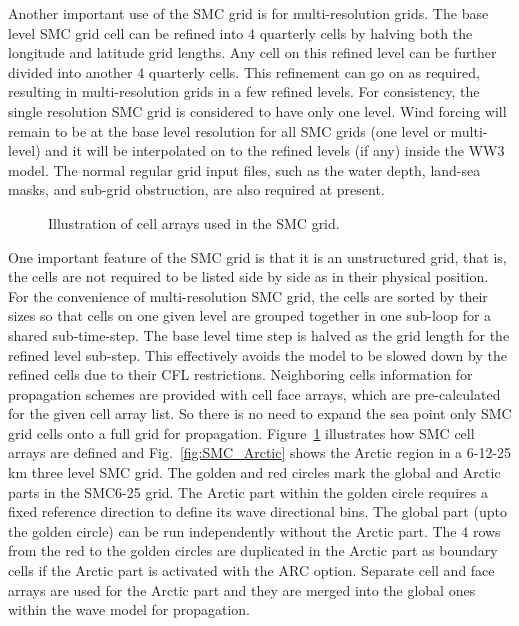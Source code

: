 Another important use of the SMC grid is for multi-resolution grids.
The base level SMC grid cell can be refined into 4 quarterly cells
by halving both the longitude and latitude grid lengths. Any cell
on this refined level can be further divided into another 4 quarterly
cells. This refinement can go on as required, resulting in multi-resolution
grids in a few refined levels. For consistency, the single resolution
SMC grid is considered to have only one level. Wind forcing will remain
to be at the base level resolution for all SMC grids (one level or
multi-level) and it will be interpolated on to the refined levels
(if any) inside the WW3 model. The normal regular grid input files,
such as the water depth, land-sea masks, and sub-grid obstruction,
are also required at present. 

\begin{figure}
\centerline{}
\caption{Illustration of cell arrays used in the SMC grid.}
\label{fig:SMCells} \botline
\end{figure}

One important feature of the SMC grid is that it is an unstructured grid, that
is, the cells are not required to be listed side by side as in their physical
position. For the convenience of multi-resolution SMC grid, the cells are
sorted by their sizes so that cells on one given level are grouped together in
one sub-loop for a shared sub-time-step.  The base level time step is halved
as the grid length for the refined level sub-step. This effectively avoids the
model to be slowed down by the refined cells due to their CFL
restrictions. Neighboring cells information for propagation schemes are
provided with cell face arrays, which are pre-calculated for the given cell
array list. So there is no need to expand the sea point only SMC grid cells
onto a full grid for propagation. Figure~\ref{fig:SMCells} illustrates how SMC
cell arrays are defined and Fig.~\ref{fig:SMC_Arctic} shows the Arctic region
in a 6-12-25 km three level SMC grid. The golden and red circles mark the
global and Arctic parts in the SMC6-25 grid. The Arctic part within the golden
circle requires a fixed reference direction to define its wave directional
bins. The global part (upto the golden circle) can be run independently
without the Arctic part. The 4 rows from the red to the golden circles are
duplicated in the Arctic part as boundary cells if the Arctic part is
activated with the ARC option. Separate cell and face arrays are used for the
Arctic part and they are merged into the global ones within the wave model for
propagation.

